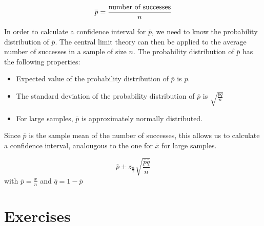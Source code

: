 \[ \overline{p} = \frac{\textnormal{number of successes}}{n} \]

In order to calculate a confidence interval for $\overline{p}$, we need to know the probability distribution of $\overline{p}$. The central limit theory can then be applied to the average number of successes in a sample of size $n$. The probability distribution of $\overline{p}$ has the following properties:

\begin{itemize}
  \item Expected value of the probability distribution of  $\overline{p}$ is $p$.
  \item The standard deviation of the probability distribution of $\overline{p}$ is $\sqrt{\frac{pq}{n}}$
  \item For large samples, $\overline{p}$ is approximately normally distributed.
\end{itemize}

Since $\overline{p}$ is the sample mean of the number of successes, this allows us to calculate a confidence interval, analougous to the one for $\overline{x}$ for large samples.

\begin{definition}
  \[ \overline{p} \pm z_{\frac{\alpha}{2}} \sqrt{\frac{\overline{p}\overline{q}}{n}} \]
  with $\overline{p} = \frac{x}{n}$ and $\overline{q} = 1- \overline{p}$
\end{definition}

\section{Exercises}
\label{sec:sampling-exercises}

